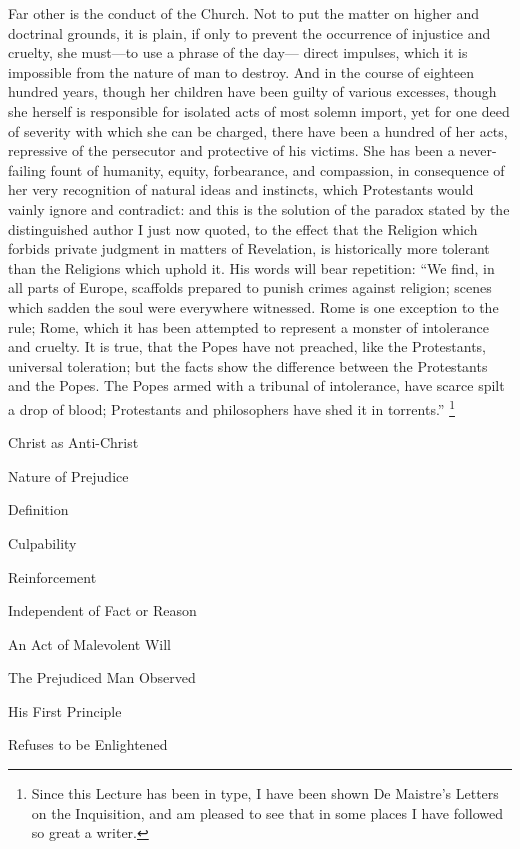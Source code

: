 Far other is the conduct of the Church. Not to put the
matter on higher and doctrinal grounds, it is plain, if
only to prevent the occurrence of injustice and cruelty,
she must—to use a phrase of the day— direct
impulses, which it is impossible from the nature of man
to destroy. And in the course of eighteen hundred years,
though her children have been guilty of various excesses,
though she herself is responsible for isolated acts of
most solemn import, yet for one deed of severity with
which she can be charged, there have been a hundred of
her acts, repressive of the persecutor and protective of
his victims. She has been a never-failing fount of
humanity, equity, forbearance, and compassion, in
consequence of her very recognition of natural ideas and
instincts, which Protestants would vainly ignore and
contradict: and this is the solution of the paradox
stated by the distinguished author I just now quoted, to
the effect that the Religion which forbids private
judgment in matters of Revelation, is historically more
tolerant than the Religions which uphold it. His words
will bear repetition: ``We find, in all parts of
Europe, scaffolds prepared to punish crimes against
religion; scenes which sadden the soul were everywhere
witnessed. Rome is one exception to the rule; Rome, which
it has been attempted to represent a monster of
intolerance and cruelty. It is true, that the Popes have
not preached, like the Protestants, universal toleration;
but the facts show the difference between the Protestants
and the Popes. The Popes armed with a tribunal of
intolerance, have scarce spilt a drop of blood;
Protestants and philosophers have shed it in
torrents.'' \footnote{Since this Lecture has been
in type, I have been shown De Maistre's Letters on the
Inquisition, and am pleased to see that in some places I
have followed so great a writer.}


Christ as Anti-Christ

Nature of Prejudice

Definition

Culpability

Reinforcement

Independent of
Fact or Reason

An Act of Malevolent
Will

The Prejudiced Man
Observed

His First
Principle

Refuses to be
Enlightened

